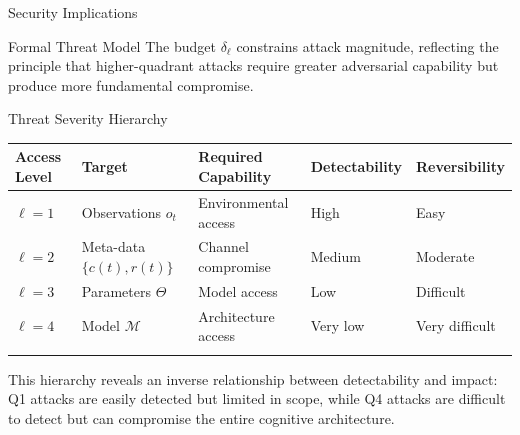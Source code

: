 \documentclass[
  ignorenonframetext,
]{beamer}
\newcounter{none} %
\begin{document}
\begin{frame}{Security Implications}
\begin{block}{Formal Threat Model}
The budget \(\delta_\ell\) constrains attack magnitude, reflecting the
principle that higher-quadrant attacks require greater adversarial
capability but produce more fundamental compromise.

\begin{block}{Threat Severity Hierarchy}
\protect{}\label{threat-severity-hierarchy}
{\def\LTcaptype{none} %
\begin{longtable}[]{@{}
  >{\centering\arraybackslash}p{}
  >{\raggedright\arraybackslash}p{}
  >{\raggedright\arraybackslash}p{}
  >{\centering\arraybackslash}p{}
  >{\centering\arraybackslash}p{}@{}}
\toprule\noalign{}
\begin{minipage}[b]{\linewidth}\centering
Access Level
\end{minipage} & \begin{minipage}[b]{\linewidth}\raggedright
Target
\end{minipage} & \begin{minipage}[b]{\linewidth}\raggedright
Required Capability
\end{minipage} & \begin{minipage}[b]{\linewidth}\centering
Detectability
\end{minipage} & \begin{minipage}[b]{\linewidth}\centering
Reversibility
\end{minipage} \\
\midrule\noalign{}
\endhead
\(\ell = 1\) & Observations \(o_t\) & Environmental access & High &
Easy \\
\(\ell = 2\) & Meta-data \(\{c(t), r(t)\}\) & Channel compromise &
Medium & Moderate \\
\(\ell = 3\) & Parameters \(\Theta\) & Model access & Low & Difficult \\
\(\ell = 4\) & Model \(\mathcal{M}\) & Architecture access & Very low &
Very difficult \\
\bottomrule\noalign{}
\end{longtable}
}

This hierarchy reveals an inverse relationship between detectability and
impact: Q1 attacks are easily detected but limited in scope, while Q4
attacks are difficult to detect but can compromise the entire cognitive
architecture.
\end{block}


\end{block}
\end{frame}
\end{document}
